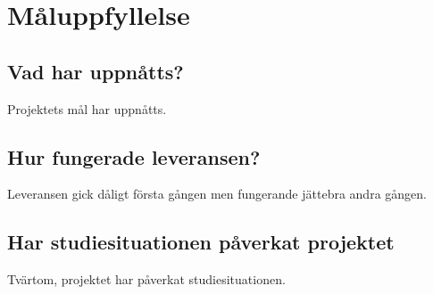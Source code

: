 
\section{Måluppfyllelse}

\subsection{Vad har uppnåtts?}
Projektets mål har uppnåtts.

\subsection{Hur fungerade leveransen?}
Leveransen gick dåligt första gången men fungerande jättebra andra gången.

\subsection{Har studiesituationen påverkat projektet}
Tvärtom, projektet har påverkat studiesituationen.